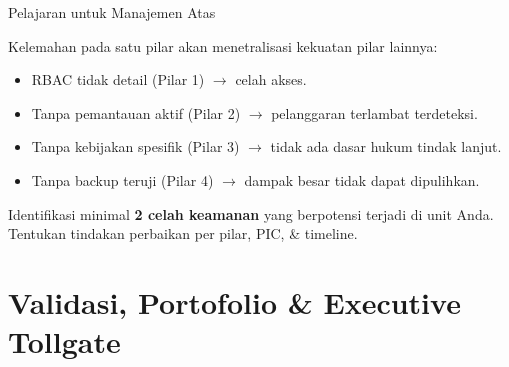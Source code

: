 \documentclass[aspectratio=169,11pt]{beamer}
\begin{document}
\begin{frame}{Pelajaran untuk Manajemen Atas}
    \vspace{0.2cm}
    \begin{premiumbox}
        \small
        Kelemahan pada satu pilar akan menetralisasi kekuatan pilar lainnya:
        \begin{itemize}
            \item RBAC tidak detail (Pilar 1) $\rightarrow$ celah akses.
            \item Tanpa pemantauan aktif (Pilar 2) $\rightarrow$ pelanggaran terlambat terdeteksi.
            \item Tanpa kebijakan spesifik (Pilar 3) $\rightarrow$ tidak ada dasar hukum tindak lanjut.
            \item Tanpa backup teruji (Pilar 4) $\rightarrow$ dampak besar tidak dapat dipulihkan.
        \end{itemize}
    \end{premiumbox}
    
    \vspace{0.2cm}
    \begin{greenbox}
        \small
        Identifikasi minimal \textbf{2 celah keamanan} yang berpotensi terjadi di unit Anda. Tentukan tindakan perbaikan per pilar, PIC, \& timeline.
    \end{greenbox}
\end{frame}


\section{Validasi, Portofolio \& Executive Tollgate}
\end{document}
